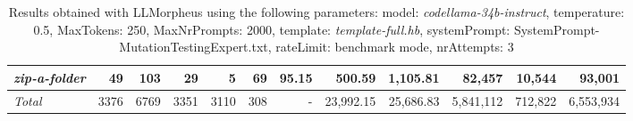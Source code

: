 \begin{table*}
{\begin{tabular}{l||r|r|r|r|r|r||r|r||r|r|r}
   \hline
   \textit{zip-a-folder} & 49 & 103 & 29 & 5 & 69 & 95.15 & 500.59 & 1,105.81 & 82,457 & 10,544 & 93,001 \\ 
   \hline
   \textit{Total} & 3376 & 6769 & 3351 & 3110 & 308 & - & 23,992.15  & 25,686.83 & 5,841,112 & 712,822 & 6,553,934 \\ 
 \end{tabular}
 }
 \caption{Results obtained with LLMorpheus using the following parameters: 
   model: \textit{codellama-34b-instruct}, 
   temperature: 0.5, 
   MaxTokens: 250, 
   MaxNrPrompts: 2000, 
   template: \textit{template-full.hb}, 
   systemPrompt: SystemPrompt-MutationTestingExpert.txt, 
   rateLimit: benchmark mode, 
   nrAttempts: 3  
 }
\end{table*}

